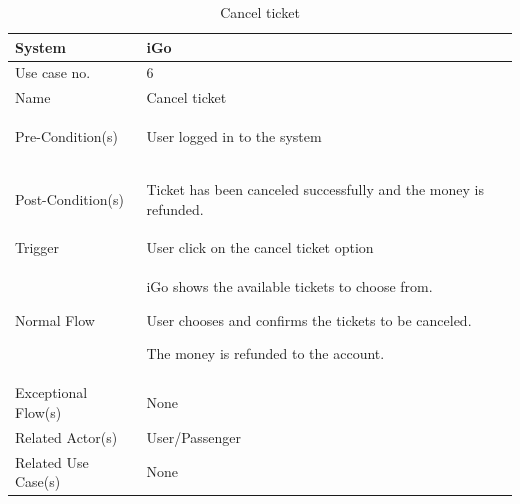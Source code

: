 \documentclass{article}
\begin{document}
\begin{table}[ht]
    \centering
    \begin{tabular}{|l|p{11cm}|}
         \hline
         System& iGo\\
         \hline
         Use case no. & 6 \\
         \hline
         Name & Cancel ticket \\
         \hline
         Pre-Condition(s)   & 
         \begin{enumerate*}[itemjoin=\newline]
             \item User logged in to the system
         \end{enumerate*} \\
         \hline
         Post-Condition(s)  & 
         \begin{enumerate*}[itemjoin=\newline]
             \item Ticket has been canceled successfully and the money is refunded.
         \end{enumerate*} \\
         \hline
         Trigger& User click on the cancel ticket option \\
         \hline
         Normal Flow        & 
         \begin{enumerate*}[itemjoin=\newline]
             \item iGo shows the available tickets to choose from. 
             \item User chooses and confirms the tickets to be canceled. 
             \item The money is refunded to the account. 
         \end{enumerate*} \\
         \hline
         Exceptional Flow(s)& None\\
         \hline
         Related Actor(s)   & User/Passenger\\
         \hline
         Related Use Case(s)& None\\
         \hline
    \end{tabular}
    \caption{Cancel ticket}
    \label{tab:UC_cancel}
\end{table}
\end{document}
